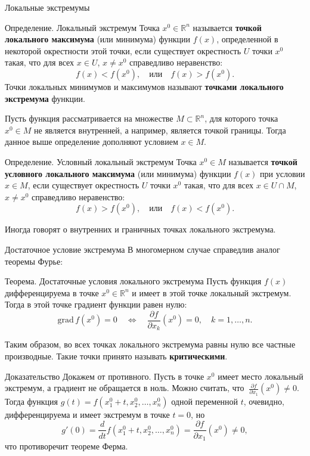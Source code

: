 \documentclass[8pt]{beamer}
\newcommand{\grad}{\mathrm{grad\,}}
\newcommand{\pp}[2]{\frac{\partial #1}{\partial #2}}
\begin{document}
\begin{frame}{Локальные экстремумы}
\begin{block}{Определение. Локальный экстремум}
Точка $x^0\in\mathbb{R}^n$ называется {\bf точкой локального максимума} (или минимума) функции $f(x)$, определенной в некоторой окрестности этой точки, если существует окрестность $U$ точки $x^0$ такая, что для всех $x\in U$, $x\ne x^0$ справедливо неравенство:
$$f(x) < f(x^0),\quad \text{или}\quad f(x) > f(x^0).$$
Точки локальных минимумов и максимумов называют {\bf точками локального экстремума} функции.
\end{block}
\pause
Пусть функция рассматривается на множестве $M\subset\mathbb{R}^n$, для которого точка $x^0\in M$ не является внутренней, а например, является точкой границы. Тогда данное выше определение дополняют условием $x\in M$.
\begin{block}{Определение. Условный локальный экстремум}
Точка $x^0\in M$ называется {\bf точкой условного локального максимума} (или минимума) функции $f(x)$ при условии $x\in M$, если существует окрестность $U$ точки $x^0$ такая, что для всех $x\in U\cap M$, $x\ne x^0$ справедливо неравенство:
$$f(x) > f(x^0),\quad \text{или}\quad f(x)<f(x^0).$$
\end{block}
Иногда говорят о внутренних и граничных точках локального экстремума.
\end{frame}

\begin{frame}{Достаточное условие экстремума}
В многомерном случае справедлив аналог теоремы Фурье:
\begin{block}{Теорема. Достаточные условия локального экстремума}
Пусть функция $f(x)$ дифференцируема в точке $x^0\in\mathbb{R}^n$ и имеет в этой точке локальный экстремум. Тогда в этой точке градиент функции равен нулю:
$$\grad f(x^0) = 0\quad \iff\quad \pp{f}{x_k}(x^0) = 0,\quad k=1,\ldots,n.$$
\end{block}
Таким образом, во всех точках локального экстремума равны нулю все частные производные. Такие точки принято называть {\bf критическими}.
\begin{block}{Доказательство}
Докажем от противного. Пусть в точке $x^0$ имеет место локальный экстремум, а градиент не обращается в ноль. Можно считать, что $\ \displaystyle \pp{f}{x_1}(x^0)\ne 0$. Тогда функция $g(t) = f(x_1^0+t,x_2^0,\ldots,x_n^0)$ одной переменной $t$, очевидно, дифференцируема и имеет экстремум в точке $t=0$, но
$$g'(0) = \frac{d}{dt}f(x_1^0+t,x_2^0,\ldots,x_n^0) = \pp{f}{x_1}(x^0)\ne0,$$
что противоречит теореме Ферма.
\end{block}
\end{frame}
\end{document}
